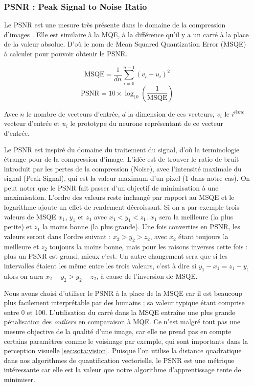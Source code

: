 	\subsubsection{PSNR : Peak Signal to Noise Ratio}

	Le PSNR est une mesure très présente dans le domaine de la compression d'images \cite{huynh-psnr, korhonen-psnr}. Elle est similaire à la MQE, à la différence qu'il y a un carré à la place de la valeur absolue. D'où le nom de Mean Squared Quantization Error (MSQE) à calculer pour pouvoir obtenir le PSNR.
	
	\begin{equation}
		\text{MSQE} = \frac{1}{dn} \sum_{i=0}^{n-1} (v_i - u_i)^2
	\end{equation}
	\begin{equation}
		\text{PSNR} = 10 \times \log_{10} \left( \frac{1}{\text{MSQE}} \right)
	\end{equation}

	Avec $n$ le nombre de vecteurs d'entrée, $d$ la dimension de ces vecteurs, $v_i$ le $i^{\textit{ième}}$ vecteur d'entrée et $u_i$ le prototype du neurone représentant de ce vecteur d'entrée.

	Le PSNR est inspiré du domaine du traitement du signal, d'où la terminologie étrange pour de la compression d'image. L'idée est de trouver le ratio de bruit introduit par les pertes de la compression (Noise), avec l'intensité maximale du signal (Peak Signal), qui est la valeur maximum d'un pixel (1 dans notre cas). On peut noter que le PSNR fait passer d'un objectif de minimisation à une maximisation. L'ordre des valeurs reste inchangé par rapport au MSQE et le logarithme ajoute un effet de rendement décroissant. Si on a par exemple trois valeurs de MSQE $x_1$, $y_1$ et $z_1$ avec $x_1 < y_1 < z_1$. $x_1$ sera la meilleure (la plus petite) et $z_1$ la moins bonne (la plus grande). Une fois converties en PSNR, les valeurs seront dans l'ordre suivant : $x_2 > y_2 > z_2$, avec $x_2$ étant toujours la meilleure et $z_2$ toujours la moins bonne, mais pour les raisons inverses cette fois : plus un PSNR est grand, mieux c'est. Un autre changement sera que si les intervalles étaient les même entre les trois valeurs, c'est à dire si $y_1 - x_1 = z_1 - y_1$ alors on aura $x_2 - y_2 > y_2 - z_2$, à cause de l'inversion de MSQE.

	Nous avons choisi d'utiliser le PSNR à la place de la MSQE car il est beaucoup plus facilement interprétable par des humains ; sa valeur typique étant comprise entre 0 et 100. L'utilisation du carré dans la MSQE entraîne une plus grande pénalisation des \textit{outliers} en comparaison à MQE. Ce n'est malgré tout pas une mesure objective de la qualité d'une image, car elle ne prend pas en compte certains paramètres comme le voisinage par exemple, qui sont importants dans la perception visuelle \ref{sec:sota:vision}. Puisque l'on utilise la distance quadratique dans nos algorithmes de quantification vectorielle, le PSNR est une métrique intéressante car elle est la valeur que notre algorithme d'apprentissage tente de minimiser.
	
